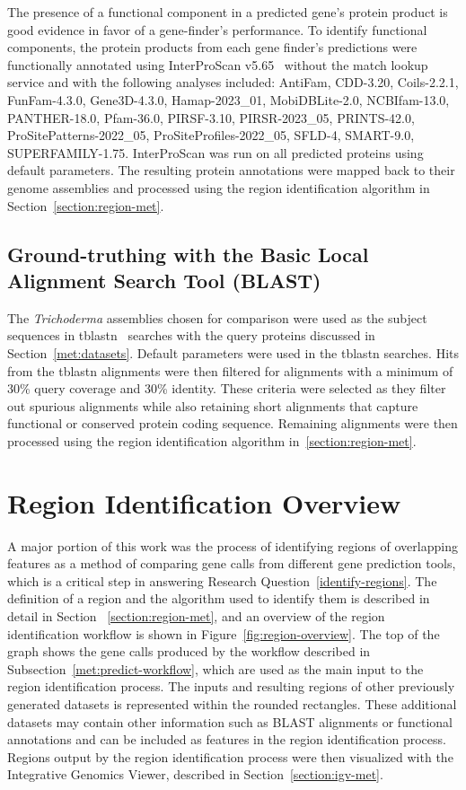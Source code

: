The presence of a functional component in a predicted gene's protein
product is good evidence in favor of a gene-finder's performance. To
identify functional components, the protein products from each gene
finder's predictions were functionally annotated using InterProScan
v5.65~\cite{jones2014} without the match
lookup service and with the following analyses included: AntiFam,
CDD-3.20, Coils-2.2.1, FunFam-4.3.0, Gene3D-4.3.0, Hamap-2023\_01,
MobiDBLite-2.0, NCBIfam-13.0, PANTHER-18.0, Pfam-36.0, PIRSF-3.10,
PIRSR-2023\_05, PRINTS-42.0, ProSitePatterns-2022\_05,
ProSiteProfiles-2022\_05, SFLD-4, SMART-9.0,
SUPERFAMILY-1.75. InterProScan was run on all predicted proteins using
default parameters. The resulting protein annotations were mapped back
to their genome assemblies and processed using the region
identification algorithm in Section~\ref{section:region-met}.

\subsection{Ground-truthing with the Basic Local Alignment Search Tool (BLAST)}\label{met:blast}

The \textit{Trichoderma} assemblies chosen for comparison were used as
the subject sequences in tblastn~\cite{gertz2006} searches with the query proteins discussed in Section~\ref{met:datasets}. Default parameters were used in the tblastn searches. Hits from the tblastn alignments were then filtered for alignments with a minimum of 30\% query coverage and 30\% identity. These criteria were selected as they filter out spurious alignments while also retaining short alignments that capture functional or conserved protein coding sequence. Remaining alignments were then processed using the region identification algorithm in~\ref{section:region-met}. 

\section{Region Identification Overview}\label{section:region-overview}

A major portion of this work was the process of identifying regions of
overlapping features as a method of comparing gene calls from
different gene prediction tools, which is a critical step in answering Research Question~\ref{identify-regions}. The definition of a region and the algorithm
used to identify them is described in detail in Section
~\ref{section:region-met}, and an overview of the region identification
workflow is shown in Figure~\ref{fig:region-overview}. The top of the
graph shows the gene calls produced by the workflow described in
Subsection~\ref{met:predict-workflow}, which are used as the main input
to the region identification process. The inputs and resulting regions of other previously
generated datasets is represented within the rounded rectangles. These additional datasets may contain other
information such as BLAST alignments or functional annotations and can
be included as features in the region identification process. Regions output by the region identification process
were then visualized with the Integrative Genomics Viewer, described
in Section~\ref{section:igv-met}.

